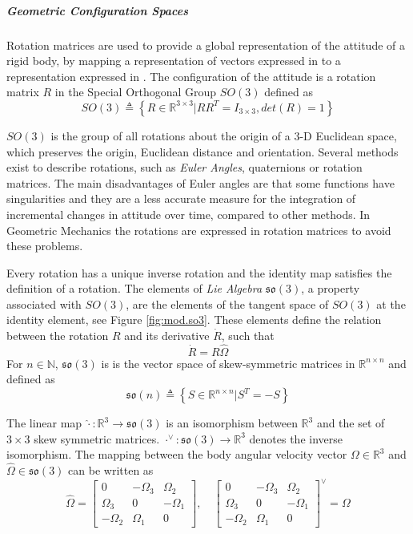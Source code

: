 \subparagraph{Geometric Configuration Spaces}
Rotation matrices are used to provide a global representation of the attitude of a rigid body, by mapping a representation of vectors expressed in \BF to a representation expressed in \IF \cite{Chaturvedi2011,Murray1994}. 
The configuration of the  attitude is a rotation matrix $ R $ in the Special Orthogonal Group $ SO(3) $ defined as
\begin{equation}\label{eq:SO3}
SO(3) \triangleq \left\lbrace R\in\mathbb{R}^{3\times3}|RR^T=I_{3\times3}, det(R)=1\right\rbrace 
\end{equation}

$ SO(3) $ is the group of all rotations about the origin of a 3-D Euclidean space, which preserves the origin, Euclidean distance and orientation.
Several methods exist to describe rotations, such as \textit{Euler Angles}, quaternions or rotation matrices. 
The main disadvantages of Euler angles are that some functions have singularities and they are a less accurate measure for the integration of incremental changes in attitude over time, compared to other methods. 
In Geometric Mechanics the rotations are expressed in rotation matrices to avoid these problems. 

Every rotation has a unique inverse rotation and the identity map satisfies the definition of a rotation. The elements of \textit{Lie Algebra} $ \mathfrak{so}(3) $, a property associated with $ SO(3) $, are the elements of the tangent space of $ SO(3) $ at the identity element, see Figure \ref{fig:mod.so3}. 
These elements define the relation between the rotation $ R $ and its derivative $ \dot{R} $, such that
\begin{equation}\label{eq:Rdot}
\dot{R} = R\hat{\Omega}
\end{equation}
For $ n\in \mathbb{N} $, $ \mathfrak{so}(3) $ is is the vector space of skew-symmetric matrices in $ \mathbb{R}^{n\times n} $ and defined as
\begin{equation}\label{eq:so3}
\mathfrak{so}(n) \triangleq \left\lbrace S\in \mathbb{R}^{n\times n}|S^T=-S\right\rbrace
\end{equation}

The linear map $ \hat{\cdot}:\mathbb{R}^3\rightarrow\mathfrak{so}(3) $ is an isomorphism between $ \mathbb{R}^3 $ and the set of $ 3\times 3 $ skew symmetric matrices. $ \cdot^\vee:\mathfrak{so}(3)\rightarrow\mathbb{R}^3 $ denotes the inverse isomorphism. The mapping between the body angular velocity vector $ \Omega\in\mathbb{R}^3 $ and  $ \hat{\Omega}\in\mathfrak{so}(3) $ can be written as
\begin{equation}\label{eq:mod.hatOmega}
\hat{\Omega}=\begin{bmatrix}
0&-\Omega_3&\Omega_2\\
\Omega_3&0&-\Omega_1\\
-\Omega_2&\Omega_1&0
\end{bmatrix},
\quad
\begin{bmatrix}
0&-\Omega_3&\Omega_2\\
\Omega_3&0&-\Omega_1\\
-\Omega_2&\Omega_1&0
\end{bmatrix}^\vee = \Omega
\end{equation}

